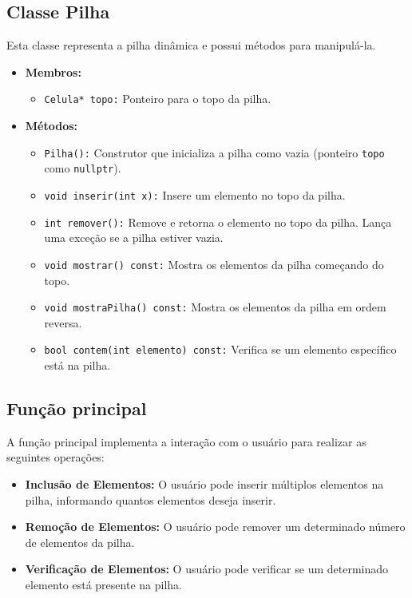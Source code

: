 \documentclass[a4paper,12pt]{article}
\begin{document}
\subsection{Classe Pilha}
Esta classe representa a pilha dinâmica e possui métodos para manipulá-la.
\begin{itemize}
    \item \textbf{Membros:}
    \begin{itemize}
        \item \texttt{Celula* topo:} Ponteiro para o topo da pilha.
    \end{itemize}
    \item \textbf{Métodos:}
    \begin{itemize}
        \item \texttt{Pilha():} Construtor que inicializa a pilha como vazia (ponteiro \texttt{topo} como \texttt{nullptr}).
        \item \texttt{void inserir(int x):} Insere um elemento no topo da pilha.
        \item \texttt{int remover():} Remove e retorna o elemento no topo da pilha. Lança uma exceção se a pilha estiver vazia.
        \item \texttt{void mostrar() const:} Mostra os elementos da pilha começando do topo.
        \item \texttt{void mostraPilha() const:} Mostra os elementos da pilha em ordem reversa.
        \item \texttt{bool contem(int elemento) const:} Verifica se um elemento específico está na pilha.
    \end{itemize}
\end{itemize}

\subsection{Função principal}
A função principal implementa a interação com o usuário para realizar as seguintes operações:
\begin{itemize}
    \item \textbf{Inclusão de Elementos:} O usuário pode inserir múltiplos elementos na pilha, informando quantos elementos deseja inserir.
    \item \textbf{Remoção de Elementos:} O usuário pode remover um determinado número de elementos da pilha.
    \item \textbf{Verificação de Elementos:} O usuário pode verificar se um determinado elemento está presente na pilha.
\end{itemize}
\end{document}
